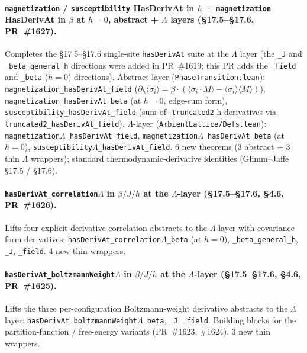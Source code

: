 \documentclass[a4paper,11pt]{article}
\newcommand{\LeanLambda}{\texorpdfstring{\ensuremath{\Lambda}}{Lambda}}
\begin{document}
\paragraph{\texttt{magnetization} / \texttt{susceptibility}
HasDerivAt in $h$ + \texttt{magnetization} HasDerivAt in $\beta$
at $h = 0$, abstract + $\Lambda$ layers
(\S17.5--\S17.6, PR~\#1627).} Completes the §17.5--§17.6
single-site \texttt{hasDerivAt} suite at the $\Lambda$ layer
(the \texttt{\_J} and \texttt{\_beta\_general\_h} directions
were added in PR~\#1619; this PR adds the \texttt{\_field} and
\texttt{\_beta} ($h = 0$) directions). Abstract layer
(\texttt{PhaseTransition.lean}):
\texttt{magnetization\_hasDerivAt\_field}
($\partial_h \langle\sigma_i\rangle = \beta \cdot
(\langle\sigma_i \cdot M\rangle - \langle\sigma_i\rangle
\langle M\rangle)$),
\texttt{magnetization\_hasDerivAt\_beta} (at $h = 0$, edge-sum
form), \texttt{susceptibility\_hasDerivAt\_field} (sum-of-
\texttt{truncated2} h-derivatives via
\texttt{truncated2\_hasDerivAt\_field}). $\Lambda$-layer
(\texttt{AmbientLattice/Defs.lean}):
\texttt{magnetization\LeanLambda\_hasDerivAt\_field},
\texttt{magnetization\LeanLambda\_hasDerivAt\_beta} (at $h = 0$),
\texttt{susceptibility\LeanLambda\_hasDerivAt\_field}. 6 new theorems
(3 abstract + 3 thin $\Lambda$ wrappers); standard
thermodynamic-derivative identities (Glimm--Jaffe §17.5 / §17.6).

\paragraph{\texttt{hasDerivAt\_correlation\LeanLambda} in $\beta / J / h$
at the $\Lambda$-layer (\S17.5--\S17.6, \S4.6, PR~\#1626).}
Lifts four explicit-derivative correlation abstracts to the
$\Lambda$ layer with covariance-form derivatives:
\texttt{hasDerivAt\_correlation\LeanLambda\_beta} (at $h = 0$),
\texttt{\_beta\_general\_h},
\texttt{\_J}, \texttt{\_field}. 4 new thin wrappers.

\paragraph{\texttt{hasDerivAt\_boltzmannWeight\LeanLambda} in $\beta / J / h$
at the $\Lambda$-layer (\S17.5--\S17.6, \S4.6, PR~\#1625).}
Lifts the three per-configuration Boltzmann-weight derivative
abstracts to the $\Lambda$ layer:
\texttt{hasDerivAt\_boltzmannWeight\LeanLambda\_beta},
\texttt{\_J}, \texttt{\_field}. Building blocks for the
partition-function / free-energy variants (PR~\#1623, \#1624).
3 new thin wrappers.
\end{document}
